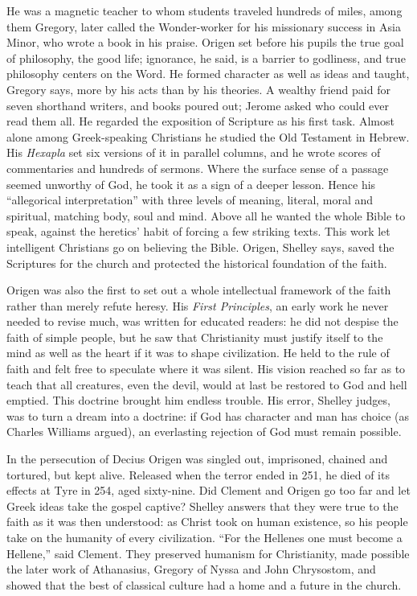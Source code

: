 He was a magnetic teacher to whom students traveled hundreds of miles, among them Gregory, later
called the Wonder-worker for his missionary success in Asia Minor, who wrote a book in his praise.
Origen set before his pupils the true goal of philosophy, the good life; ignorance, he said, is a
barrier to godliness, and true philosophy centers on the Word. He formed character as well as ideas
and taught, Gregory says, more by his acts than by his theories. A wealthy friend paid for seven
shorthand writers, and books poured out; Jerome asked who could ever read them all. He regarded the
exposition of Scripture as his first task. Almost alone among Greek-speaking Christians he studied the
Old Testament in Hebrew. His \emph{Hexapla} set six versions of it in parallel columns, and he wrote
scores of commentaries and hundreds of sermons. Where the surface sense of a passage seemed unworthy
of God, he took it as a sign of a deeper lesson. Hence his ``allegorical interpretation'' with three
levels of meaning, literal, moral and spiritual, matching body, soul and mind. Above all he wanted
the whole Bible to speak, against the heretics' habit of forcing a few striking texts. This work let
intelligent Christians go on believing the Bible. Origen, Shelley says, saved the Scriptures for the
church and protected the historical foundation of the faith.

Origen was also the first to set out a whole intellectual framework of the faith rather than merely
refute heresy. His \emph{First Principles}, an early work he never needed to revise much, was written
for educated readers: he did not despise the faith of simple people, but he saw that Christianity
must justify itself to the mind as well as the heart if it was to shape civilization. He held to the
rule of faith and felt free to speculate where it was silent. His vision reached so far as to teach
that all creatures, even the devil, would at last be restored to God and hell emptied. This doctrine
brought him endless trouble. His error, Shelley judges, was to turn a dream into a doctrine: if God
has character and man has choice (as Charles Williams argued), an everlasting rejection of God must
remain possible.

In the persecution of Decius Origen was singled out, imprisoned, chained and tortured, but kept alive.
Released when the terror ended in 251, he died of its effects at Tyre in 254, aged sixty-nine. Did
Clement and Origen go too far and let Greek ideas take the gospel captive? Shelley answers that they
were true to the faith as it was then understood: as Christ took on human existence, so his people
take on the humanity of every civilization. ``For the Hellenes one must become a Hellene,'' said
Clement. They preserved humanism for Christianity, made possible the later work of Athanasius, Gregory
of Nyssa and John Chrysostom, and showed that the best of classical culture had a home and a future in
the church.

